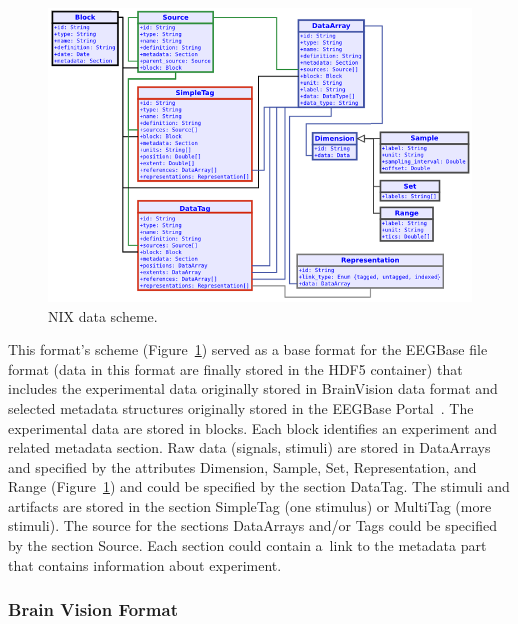 \documentclass[conference]{IEEEtran}
\begin{document}
\begin{figure}[h]
	\centering
	\includegraphics[scale=0.9]{obrazky/NIX_scheme.png}
	\caption{NIX data scheme. \cite{pandora}}
	\label{NIX_scheme}
\end{figure}


This format's scheme (Figure~\ref{NIX_scheme}) served as a base format for the EEGBase file format (data in this format are finally stored in the HDF5 container) that includes the experimental data originally stored in BrainVision data format and selected metadata structures originally stored in the EEGBase Portal~\cite{eegportal}. The experimental data are stored in blocks. Each block identifies an experiment and related metadata section. Raw data (signals, stimuli) are stored in DataArrays and specified by the attributes Dimension, Sample, Set, Representation, and Range (Figure~\ref{NIX_scheme}) and could be specified by the section DataTag. The stimuli and artifacts are stored in the section SimpleTag (one stimulus) or MultiTag (more stimuli). The source for the sections DataArrays and/or Tags could be specified by the section Source. Each section could contain a~link to the metadata part that contains information about experiment.

\subsubsection{Brain Vision Format}
\end{document}
